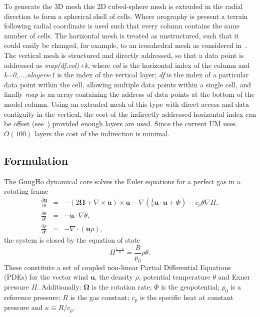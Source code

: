 \documentclass[review,times]{elsarticle}
\begin{document}
To generate the 3D mesh this 2D cubed-sphere mesh is extruded in the radial 
direction to form a spherical shell of cells. Where orography is present a terrain
following radial coordinate is used such that every column contains the
same number of cells. The horizontal mesh is treated as unstructured,
such that it could easily be changed, for example, to an icosahedral mesh as
considered in~\cite{staniforth2012}.
The vertical mesh is structured and directly addressed, so that
a data point is addressed as \textit{map(df,col)+k}, where \textit{col}
is the horizontal index of the column and \textit{k=0,...,nlayers-1} is
the index of the vertical layer; \textit{df} is the index of a particular
data point within the cell, allowing multiple data points within a single cell, and 
finally \textit{map} is an array containing the address of data points at 
the bottom of the model column.
Using an extruded mesh of this type with direct access and data contiguity
in the vertical, the cost of the indirectly addressed horizontal index can 
be offset (see~\cite{MacDonaldEtal2011}) provided enough layers are used. 
Since the current UM uses~$O(100)$ layers the cost of the indirection is minimal.
%

\subsection{Formulation\label{sec:sub:formulation}}

The GungHo dynamical core solves the Euler equations for a perfect gas in a 
rotating frame
%
\begin{eqnarray}
\frac{\partial\mathbf{u}}{\partial t} & = & -\left(2\bm{\Omega}+\nabla\times\mathbf{u}\right)\times\mathbf{u} - \nabla\left(\frac{1}{2}\mathbf{u}\cdot\mathbf{u} + \Phi\right) - c_p\theta\nabla\Pi,\label{eq:momentum}\\
\frac{\partial\theta}{\partial t} & = & - \mathbf{u}\cdot\nabla\theta,\label{eq:energy}\\
\frac{\partial\rho}{\partial t} & = & - \nabla\cdot\left(\mathbf{u}\rho\right)\label{eq:continuity},
\end{eqnarray}
%
the system is closed by the equation of state
%
\begin{equation}
\Pi^{\frac{1-\kappa}{\kappa}} = \frac{R}{p_0}\rho\theta.\label{eq:eos}
\end{equation}
%
These constitute a set of coupled non-linear Partial Differential
Equations (PDEs) for the vector wind $\mathbf{u}$, 
the density $\rho$, potential temperature $\theta$ and Exner pressure $\Pi$. 
Additionally: $\bm{\Omega}$ is the rotation rate; $\Phi$ is the geopotential; 
$p_0$ is a reference pressure; $R$ is the gas constant; $c_p$ is the specific 
heat at constant pressure and $\kappa\equiv R/c_p$.
\end{document}
